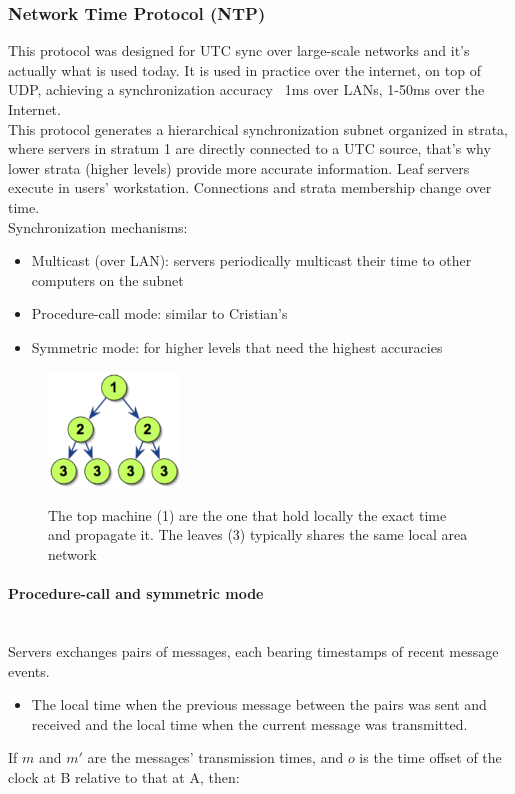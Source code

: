 \documentclass[10pt,a4paper]{article}
\newcommand{\myparagraph}[1]{\paragraph{#1}\mbox{}\\[0.05in]}
\begin{document}
\subsubsection{Network Time Protocol (NTP)}
This protocol was designed for UTC sync over large-scale networks and it's actually what is used today. It is used in practice over the internet, on top of UDP, achieving a synchronization accuracy ~1ms over LANs, 1-50ms over the Internet. \\
This protocol generates a hierarchical synchronization subnet organized in strata, where servers in stratum 1 are directly connected to a UTC source, that's why lower strata (higher levels) provide more accurate information. Leaf servers execute in users' workstation. Connections and strata membership change over time. \pagebreak \\
Synchronization mechanisms:
\begin{itemize}
	\item Multicast (over LAN): servers periodically multicast their time to other computers on the subnet
	\item Procedure-call mode: similar to Cristian's
	\item Symmetric mode: for higher levels that need the highest accuracies
\end{itemize}
\begin{figure}[h!]
 \hfill \includegraphics[width=100pt]{images/ntp.png}\hspace*{\fill}
  \label{fig:ntp}
  \caption{The top machine (1) are the one that hold locally the exact time and propagate it. The leaves (3) typically shares the same local area network}
\end{figure}
\myparagraph{Procedure-call and symmetric mode}
Servers exchanges pairs of messages, each bearing timestamps of recent message events. 
\begin{itemize}
	\item The local time when the previous message between the pairs was sent and received and the local time when the current message was transmitted.
\end{itemize}
If $m$ and $m'$ are the messages' transmission times, and $o$ is the time offset of the clock at B relative to that at A, then:
\end{document}

